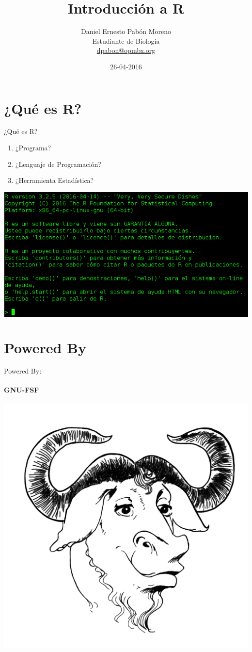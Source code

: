 \documentclass[12pt]{beamer}
\author[Daniel Pabón]{Daniel Ernesto Pabón Moreno\\
Estudiante de Biología\\ \url{dpabon@opmbx.org}}
\title{Introducción a R}
\institute{Universidad Industrial de Santander}
\date{26-04-2016}
\begin{document}
\begin{frame}
\titlepage
\end{frame}
\section{¿Qué es R?}
\begin{frame}{¿Qué es R?}
\begin{enumerate}[<+->]
\item ¿Programa?
\item ¿Lenguaje de Programación?
\item ¿Herramienta Estadística?
\end{enumerate}
\begin{center}
\includegraphics[scale=0.5]{images/image1}
\end{center}
\end{frame}
\section{Powered By}
\begin{frame}{Powered By:}
\begin{center}
\framesubtitle{GNU-FSF}
\href{https://www.gnu.org/}{\includegraphics[scale=0.15]{images/gnu}}
\end{center}
\end{frame}
\end{document}
